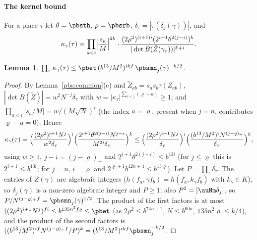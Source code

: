 \documentclass[10pt]{amsart}
\newtheorem{lemma}[theorem]{Lemma}
\theoremstyle{definition}
\theoremstyle{remark}
\begin{document}
\paragraph*{The kernel bound}
For a place $\tau$ let $\theta=\pbsth$, $\rho=\pbsrb$, $\delta_\tau=|\tau(\delta_j(\gamma))|$, and
\[
\kappa_\gamma(\tau)=\prod_{a<i}\Bigl|\frac{s_a}M\Bigr|^{2k}\cdot\frac{(2\rho^2)^{(i+1)i}(2^{i+1}\theta^{2(j-
i)})^k}{|\det B(\tilde Z(\gamma_\tau))|^{k+i}} .
\]

\begin{lemma}\label{pbs:kernel}
$\prod_\tau\kappa_\gamma(\tau)\le\pbet\,(b^{13}/M^2)^{ikf}\,\pbsmn_j(\gamma)^{-k/2}$.
\end{lemma}
\begin{proof}
By Lemma~\ref{pbs:common}(c) and $\tilde Z_{ab}=s_as_b\tau(Z_{ab})$, $|\det B(\tilde Z)|=w^2N^{-j}\delta_\tau$
with $w=|\kappa_\tau|^{\sum_{a<j}(\varrho-a)}\ge1$; and $\prod_{a<i}|s_a/M|=w/(M\sqrt N)^i$ (the index
$a=\varrho$, present when $j=n$, contributes $\varrho-a=0$). Hence
\[
\kappa_\gamma(\tau)=\Bigl(\frac{(2\rho^2)^{i+1}N^j}{w^2\delta_\tau}\Bigr)^i\Bigl(\frac{2^{i+1}\theta^{2(j-i)}
N^{j-i}}{M^{2i}\delta_\tau}\Bigr)^k\le\Bigl(\frac{(2\rho^2)^{i+1}N^j}{\delta_\tau}\Bigr)^i\Bigl(\frac{(b^{13}/
M^2)^iN^{(j-\varrho)_+}}{\delta_\tau}\Bigr)^k,
\]
using $w\ge1$, $j-i=(j-\varrho)_+$ and $2^{i+1}\theta^{2(j-i)}\le b^{13i}$ (for $j\le\varrho$ this is $2^{i+1}
\le b^{13i}$; for $j=n$, $i=\varrho$ and $2^{\varrho+1}b^{12n+4}\le b^{13\varrho}$). Let $P=\prod_\tau
\delta_\tau$. The entries of $Z(\gamma)$ are algebraic integers ($h(f_a,\gamma f_b)=h(f_a,k_\gamma f_b)$ with
$k_\gamma\in K$), so $\delta_j(\gamma)$ is a non-zero algebraic integer and $P\ge1$; also $P^2=|\auNm\delta_j|$,
so $P/N^{(j-\varrho)_+f}=\pbsmn_j(\gamma)^{1/2}$. The product of the first factors is at most $((2\rho^2)^{
i+1}N^j)^{fi}\le b^{135n^2f\varrho}\le\pbet$ (as $2\rho^2\le b^{74n+1}$, $N\le b^{60n}$, $135n^2\varrho\le k/4$),
and the product of the second factors is $((b^{13}/M^2)^{if}N^{(j-\varrho)_+f}/P)^k=(b^{13}/M^2)^{ikf}
\pbsmn_j^{-k/2}$.
\end{proof}
\end{document}
